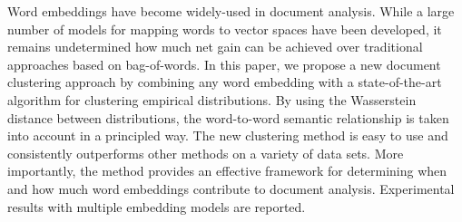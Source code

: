 Word embeddings have become widely-used in document analysis. While a large number of models for mapping words to vector spaces have been developed, it remains undetermined how much net gain can be achieved over traditional approaches based on bag-of-words. In this paper, we propose a new document clustering approach by combining any word embedding with a state-of-the-art algorithm for clustering empirical distributions. By using the Wasserstein distance between distributions, the word-to-word semantic relationship is taken into account in a principled way. The new clustering method is easy to use and consistently outperforms other methods on a variety of data sets. More importantly, the method provides an effective framework for determining when and how much word embeddings contribute to document analysis. Experimental results with multiple embedding models are reported.
